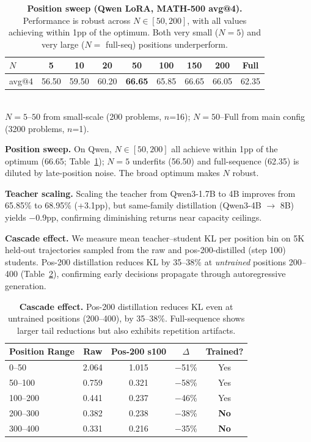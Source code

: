 \documentclass[10pt]{article}
\begin{document}
\begin{table}[t]
\centering
\caption{\textbf{Position sweep (Qwen LoRA, MATH-500 avg@4).} Performance is robust across $N \in [50, 200]$, with all values achieving within 1pp of the optimum. Both very small ($N=5$) and very large ($N=$ full-seq) positions underperform.}
\label{tab:position_sweep}
\small
\begin{tabular}{@{}lcccccccc@{}}
\toprule
$N$ & 5 & 10 & 20 & 50 & 100 & 150 & 200 & Full \\
\midrule
avg@4 & 56.50 & 59.50 & 60.20 & \textbf{66.65} & 65.85 & 66.65 & 66.05 & 62.35 \\
\bottomrule
\end{tabular}
\\[2pt]
{\footnotesize $N=5$--$50$ from small-scale (200 problems, $n$=16); $N=50$--Full from main config (3200 problems, $n$=1).}
\end{table}

\textbf{Position sweep.}
On Qwen, $N \in [50, 200]$ all achieve within 1pp of the optimum (66.65; Table~\ref{tab:position_sweep}); $N{=}5$ underfits (56.50) and full-sequence (62.35) is diluted by late-position noise. The broad optimum makes $N$ robust.

\textbf{Teacher scaling.}
Scaling the teacher from Qwen3-1.7B to 4B improves from 65.85\% to 68.95\% (+3.1pp), but same-family distillation (Qwen3-4B $\to$ 8B) yields $-$0.9pp, confirming diminishing returns near capacity ceilings.

\textbf{Cascade effect.}
We measure mean teacher--student KL per position bin on 5K held-out trajectories sampled from the raw and pos-200-distilled (step 100) students. Pos-200 distillation reduces KL by 35--38\% at \emph{untrained} positions 200--400 (Table~\ref{tab:cascade}), confirming early decisions propagate through autoregressive generation.

\begin{table}[t]
\centering
\caption{\textbf{Cascade effect.} Pos-200 distillation reduces KL even at untrained positions (200--400), by 35--38\%. Full-sequence shows larger tail reductions but also exhibits repetition artifacts.}
\label{tab:cascade}
\small
\begin{tabular}{@{}lcccc@{}}
\toprule
\textbf{Position Range} & \textbf{Raw} & \textbf{Pos-200 s100} & \textbf{$\Delta$} & \textbf{Trained?} \\
\midrule
0--50    & 2.064 & 1.015 & $-$51\% & Yes \\
50--100  & 0.759 & 0.321 & $-$58\% & Yes \\
100--200 & 0.441 & 0.237 & $-$46\% & Yes \\
200--300 & 0.382 & 0.238 & $-$38\% & \textbf{No} \\
300--400 & 0.331 & 0.216 & $-$35\% & \textbf{No} \\
\bottomrule
\end{tabular}
\end{table}
\end{document}
